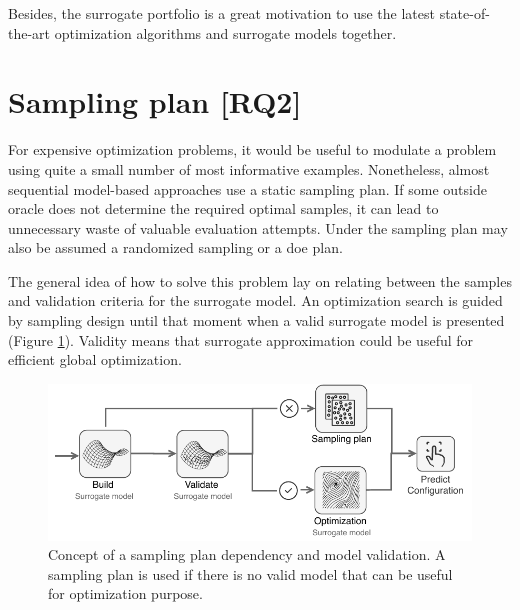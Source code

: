             

            Besides, the surrogate portfolio is a great motivation to use the latest state-of-the-art optimization algorithms and surrogate models together.  

    \section{Sampling plan [RQ2]}
        For expensive optimization problems, it would be useful to modulate a problem using quite a small number of most informative examples. Nonetheless, almost sequential model-based approaches use a static sampling plan. If some outside oracle does not determine the required optimal samples, it can lead to unnecessary waste of valuable evaluation attempts. Under the sampling plan may also be assumed a randomized sampling or a \gls{doe} plan.
        
        The general idea of how to solve this problem lay on relating between the samples and validation criteria for the surrogate model. An optimization search is guided by sampling design until that moment when a valid surrogate model is presented (Figure \ref{fig:concept_sampling}). Validity means that surrogate approximation could be useful for efficient global optimization.

            \begin{figure}
                \centering
                \includegraphics[width=\textwidth]{content/images/dinamic_sampling_plan}
                \caption[Non-dominated points]{Concept of a sampling plan dependency and model validation. A sampling plan is used if there is no valid model that can be useful for optimization purpose.} 
                \label{fig:concept_sampling} 
            \end{figure}      

